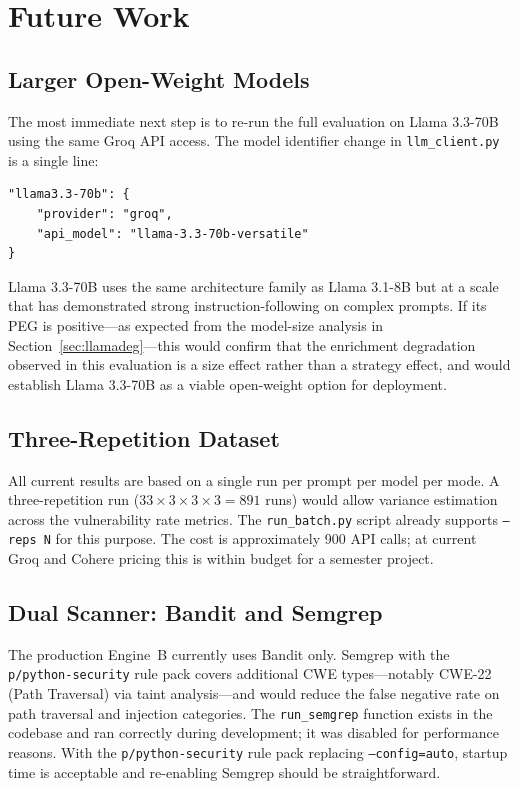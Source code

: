 \documentclass[12pt,a4paper]{report}
\begin{document}
\section{Future Work}
\label{sec:futurework}

\subsection{Larger Open-Weight Models}
\label{ssec:fw_llama}

The most immediate next step is to re-run the full evaluation on Llama 3.3-70B
using the same Groq API access. The model identifier change in
\texttt{llm\_client.py} is a single line:

\begin{lstlisting}[language={}, caption={Model string replacement for Llama 3.3-70B}]
"llama3.3-70b": {
    "provider": "groq",
    "api_model": "llama-3.3-70b-versatile"
}
\end{lstlisting}

Llama 3.3-70B uses the same architecture family as Llama 3.1-8B but at a scale
that has demonstrated strong instruction-following on complex prompts. If its PEG
is positive---as expected from the model-size analysis in
Section~\ref{sec:llamadeg}---this would confirm that the enrichment degradation
observed in this evaluation is a size effect rather than a strategy effect, and
would establish Llama 3.3-70B as a viable open-weight option for deployment.

\subsection{Three-Repetition Dataset}
\label{ssec:fw_reps}

All current results are based on a single run per prompt per model per mode.
A three-repetition run ($33 \times 3 \times 3 \times 3 = 891$ runs) would
allow variance estimation across the vulnerability rate metrics. The
\texttt{run\_batch.py} script already supports \texttt{--reps N} for this
purpose. The cost is approximately 900 API calls; at current Groq and Cohere
pricing this is within budget for a semester project.

\subsection{Dual Scanner: Bandit and Semgrep}
\label{ssec:fw_semgrep}

The production Engine~B currently uses Bandit only. Semgrep with the
\texttt{p/python-security} rule pack covers additional CWE types---notably
CWE-22 (Path Traversal) via taint analysis---and would reduce the false negative
rate on path traversal and injection categories. The \texttt{run\_semgrep}
function exists in the codebase and ran correctly during development; it was
disabled for performance reasons. With the \texttt{p/python-security} rule pack
replacing \texttt{--config=auto}, startup time is acceptable and re-enabling
Semgrep should be straightforward.
\end{document}
